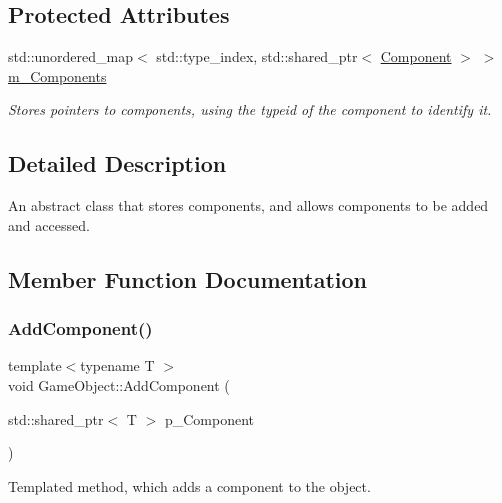 \subsection*{Protected Attributes}
\begin{DoxyCompactItemize}
\item 
\mbox{\label{class_game_object_a0cfec74680e6debbc277871b43f9d596}} 
std\+::unordered\+\_\+map$<$ std\+::type\+\_\+index, std\+::shared\+\_\+ptr$<$ \mbox{\hyperlink{class_component}{Component}} $>$ $>$ \mbox{\hyperlink{class_game_object_a0cfec74680e6debbc277871b43f9d596}{m\+\_\+\+Components}}
\begin{DoxyCompactList}\small\item\em Stores pointers to components, using the typeid of the component to identify it. \end{DoxyCompactList}\end{DoxyCompactItemize}


\subsection{Detailed Description}
An abstract class that stores components, and allows components to be added and accessed. 

\subsection{Member Function Documentation}
\mbox{\label{class_game_object_a3eee38860ec832fdc2b34f158c4a316f}} 
\subsubsection{\texorpdfstring{AddComponent()}{AddComponent()}}
{\footnotesize\ttfamily template$<$typename T $>$ \\
void Game\+Object\+::\+Add\+Component (\begin{DoxyParamCaption}\item[{std\+::shared\+\_\+ptr$<$ T $>$}]{p\+\_\+\+Component }\end{DoxyParamCaption})\hspace{0.3cm}{\ttfamily [inline]}}



Templated method, which adds a component to the object. 


